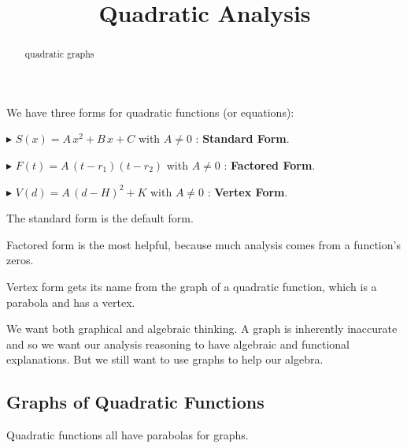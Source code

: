 \documentclass{ximera}
\title{Quadratic Analysis}
\begin{document}
\begin{abstract}
quadratic graphs
\end{abstract}
\maketitle
















We have three forms for quadratic functions (or equations):



$\blacktriangleright$ $S(x) = A \, x^2 + B \, x + C$  with $A \ne 0$ : \textbf{\textcolor{blue!55!black}{Standard Form}}. 


$\blacktriangleright$ $F(t) = A \, (t - r_1)(t - r_2)$  with $A \ne 0$ : \textbf{\textcolor{blue!55!black}{Factored Form}}. 


$\blacktriangleright$ $V(d) = A \, (d - H)^2 + K$  with $A \ne 0$ : \textbf{\textcolor{blue!55!black}{Vertex Form}}. 


The standard form is the default form.  

Factored form is the most helpful, because much analysis comes from a function's zeros.

Vertex form gets its name from the graph of a quadratic function, which is a parabola and has a vertex.







We want both graphical and algebraic thinking.  A graph is inherently inaccurate and so we want our analysis reasoning to have algebraic and functional explanations.  But we still want to use graphs to help our algebra.







\subsection*{Graphs of Quadratic Functions}



Quadratic functions all have parabolas for graphs.
\end{document}
